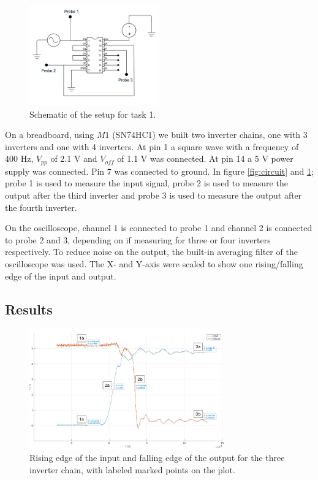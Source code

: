 \documentclass[onecolumn]{article}
\begin{document}
\begin{figure}[h!]
    \centering
    \includegraphics[width=0.5\textwidth]{circuit_schematics.png}
    \caption{Schematic of the setup for task 1.}
    \label{fig:schematic}
\end{figure}

On a breadboard, using $M1$ (SN74HC1) we built two inverter chains, one with 3 inverters and one with 4 inverters. At pin 1 a square wave with a frequency of 400 Hz, $V_{pp}$ of 2.1 V and $V_{off}$ of 1.1 V was connected. At pin 14 a 5 V power supply was connected. Pin 7 was connected to ground. In figure \ref{fig:circuit} and \ref{fig:schematic}; probe 1 is used to measure the input signal, probe 2 is used to measure the output after the third inverter and probe 3 is used to measure the output after the fourth inverter.

On the oscilloscope, channel 1 is connected to probe 1 and channel 2 is connected to probe 2 and 3, depending on if measuring for three or four inverters respectively. To reduce noise on the output, the built-in averaging filter of the oscilloscope was used. The X- and Y-axis were scaled to show one rising/falling edge of the input and output.

\clearpage

\subsection{Results}

\begin{figure}[h!]
    \centering
    \includegraphics[width=0.75\textwidth]{3_inverters_marked.png}
    \caption{Rising edge of the input and falling edge of the output for the three inverter chain, with labeled marked points on the plot.}
    \label{fig:3inv}
\end{figure}
\end{document}
